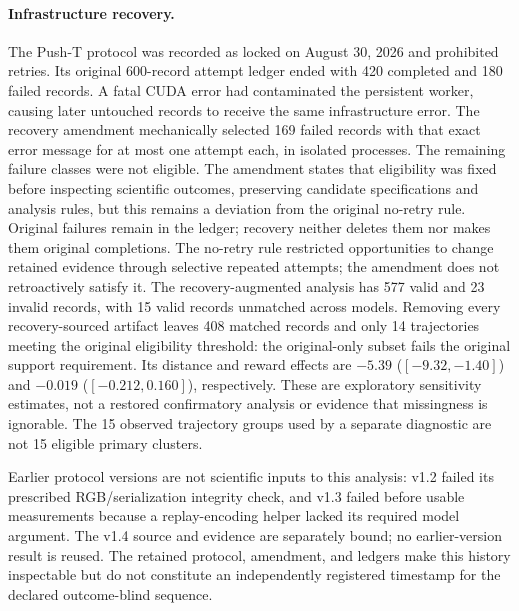 \paragraph{Infrastructure recovery.}
The Push-T protocol was recorded as locked on August 30, 2026 and prohibited
retries. Its original 600-record attempt ledger ended with 420 completed and
180 failed records. A fatal CUDA error had contaminated the persistent worker,
causing later untouched records to receive the same infrastructure error.
The recovery amendment mechanically selected 169 failed records with that
exact error message for at most one attempt each, in isolated processes.
The remaining failure classes were not eligible. The amendment states that
eligibility was fixed before inspecting scientific outcomes, preserving
candidate specifications and analysis rules, but this remains a deviation
from the original no-retry rule. Original failures remain in the ledger;
recovery neither deletes them nor makes them original completions.
The no-retry rule restricted opportunities to change retained evidence through
selective repeated attempts; the amendment does not retroactively satisfy it.
The recovery-augmented analysis has
577 valid and 23 invalid records, with 15 valid records unmatched across models.
Removing every recovery-sourced artifact leaves 408 matched records and only
14 trajectories meeting the original eligibility threshold: the original-only
subset fails the original support requirement. Its distance and reward effects
are $-5.39$ ($[-9.32,-1.40]$) and $-0.019$ ($[-0.212,0.160]$), respectively.
These are exploratory sensitivity estimates, not a restored confirmatory
analysis or evidence that missingness is ignorable. The 15 observed trajectory
groups used by a separate diagnostic are not 15 eligible primary clusters.

Earlier protocol versions are not scientific inputs to this analysis: v1.2
failed its prescribed RGB/serialization integrity check, and v1.3 failed
before usable measurements because a replay-encoding helper lacked its
required model argument. The v1.4 source and evidence are separately bound;
no earlier-version result is reused. The retained protocol, amendment, and
ledgers make this history inspectable but do not constitute an independently
registered timestamp for the declared outcome-blind sequence.

